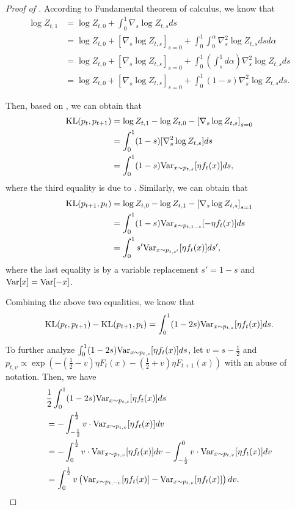 \begin{proof}[Proof of ]
According to Fundamental theorem of calculus, we know that
\begin{align*}
    \log Z_{t,1} &= \log Z_{t,0} + \int_0^1\nabla_s \log Z_{t,s}ds \\
    &=\log Z_{t,0} + [\nabla_s \log Z_{t,s}]_{s=0} +\int_0^1\int_0^\alpha \nabla_s^2 \log Z_{t,s}dsd\alpha \\
    &= \log Z_{t,0} + [\nabla_s \log Z_{t,s}]_{s=0} +\int_0^1\left(\int_s^1d\alpha\right) \nabla_s^2 \log Z_{t,s}ds \\
    &= \log Z_{t,0} + [\nabla_s \log Z_{t,s}]_{s=0} +\int_0^1(1-s)\nabla_s^2 \log Z_{t,s}ds.
\end{align*}

Then, based on , we can obtain that
\begin{align*}
     \text{\rm KL}(p_t,p_{t+1}) &= \log Z_{t,1} - \log Z_{t,0} - \left[\nabla_s \log Z_{t,s}\right]_{s=0} \\
     &= \int_0^1 (1-s)[\nabla_{s}^2\log Z_{t,s}]ds \\
     &= \int_0^1 (1-s)\mathrm{Var}_{x\sim p_{t,s}}[\eta f_t(x)]ds,
\end{align*}
where the third equality is due to . Similarly, we can obtain that
\begin{align*}
     \text{\rm KL}(p_{t+1},p_{t}) &= \log Z_{t,0} - \log Z_{t,1} - \left[\nabla_s \log Z_{t,s}\right]_{s=1} \\
     &= \int_0^1 (1-s)\mathrm{Var}_{x\sim p_{t,1-s}}[-\eta f_t(x)]ds \\
     &= \int_0^1 s'\mathrm{Var}_{x\sim p_{t,s'}}[\eta f_t(x)]ds', 
\end{align*}
where the last equality is by a variable replacement $s'=1-s$ and $\mathrm{Var}[x]=\mathrm{Var}[-x]$.

Combining the above two equalities, we know that
\begin{align}\label{eqn:KL-1}
    \text{\rm KL}(p_t,p_{t+1}) - \text{\rm KL}(p_{t+1},p_t) = \int_0^1(1-2s)\mathrm{Var}_{x\sim p_{t,s}}[\eta f_t(x)]ds.
\end{align}

To further analyze $\int_0^1(1-2s)\mathrm{Var}_{x\sim p_{t,s}}[\eta f_t(x)]ds$, let $v = s-\frac{1}{2}$ and $p_{t,v}\propto \exp(-(\frac{1}{2}-v)\eta F_t(x)-(\frac{1}{2}+v)\eta F_{t+1}(x))$ with an abuse of notation. Then, we have
\begin{align}
    &\frac{1}{2}\int_0^1(1-2s)\mathrm{Var}_{x\sim p_{t,s}}[\eta f_t(x)]ds \nonumber\\
    &= -\int_{-\frac{1}{2}}^{\frac{1}{2}}v\cdot\mathrm{Var}_{x\sim p_{t,v}}[\eta f_t(x)]dv \nonumber\\
    &= -\int_{0}^{\frac{1}{2}}v\cdot\mathrm{Var}_{x\sim p_{t,v}}[\eta f_t(x)]dv -\int_{-\frac{1}{2}}^{0}v\cdot\mathrm{Var}_{x\sim p_{t,v}}[\eta f_t(x)]dv \nonumber \\
    &= \int_0^{\frac{1}{2}}v\left(\mathrm{Var}_{x\sim p_{t,-v}}[\eta f_t(x)] - \mathrm{Var}_{x\sim p_{t,v}}[\eta f_t(x)]\right)dv. \label{eqn:KL-2}
\end{align}


\end{proof}
